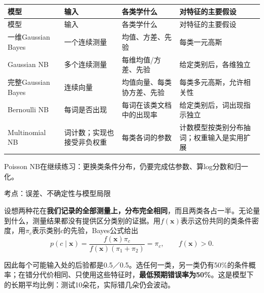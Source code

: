 \begingroup
\small\setlength{\tabcolsep}{3pt}
\renewcommand{\arraystretch}{1.22}
\begin{longtable}{@{}>{\raggedright\arraybackslash}p{}>{\raggedright\arraybackslash}p{}>{\raggedright\arraybackslash}p{}>{\raggedright\arraybackslash}p{}@{}}
\toprule
模型 & 输入 & 各类学什么 & 对特征的主要假设 \\
\midrule\endfirsthead
模型 & 输入 & 各类学什么 & 对特征的主要假设 \\
\midrule\endhead
\bottomrule\endfoot
一维Gaussian Bayes & 一个连续测量 & 均值、方差、先验 & 每类一元高斯 \\
Gaussian NB & 多个连续测量 & 每维均值/方差、先验 & 给定类别后，各维独立 \\
完整Gaussian Bayes & 连续向量 & 均值向量、每类协方差、先验 & 每类多元高斯，允许相关性 \\
Bernoulli NB & 每词是否出现 & 每词在该类文档中的出现率 & 给定类别后，词出现指示独立 \\
Multinomial NB & 词计数；实现也接受非负权重 & 每类各词的参数 & 计数模型按类别分布抽词；权重输入是实用扩展 \\
\end{longtable}
\endgroup


Poisson NB在继续练习：更换类条件分布，仍要完成估参数、算log分数和归一化。








考点：误差、不确定性与模型局限

设想两种花在\textbf{我们记录的全部测量上，分布完全相同}，而且两类各占一半。无论量到什么，测量结果都没有提供区分类别的证据。用\(f(\mathbf x)\)表示这份共同的类条件密度，用\(\pi_c\)表示类别\(c\)的先验，Bayes公式给出
\[
p(c\mid\mathbf x)
=\frac{f(\mathbf x)\pi_c}{f(\mathbf x)(\pi_1+\pi_2)}
=\pi_c,\qquad f(\mathbf x)>0.
\tag{2.35a}
\]


因此每个可能输入处的后验都是0.5／0.5。选任何一类，另一类仍有50\%的条件概率；在错分代价相同、只使用这些特征时，\textbf{最低预期错误率为50\%}。这是模型下的长期平均比例：测试10朵花，实际错几朵仍会波动。



